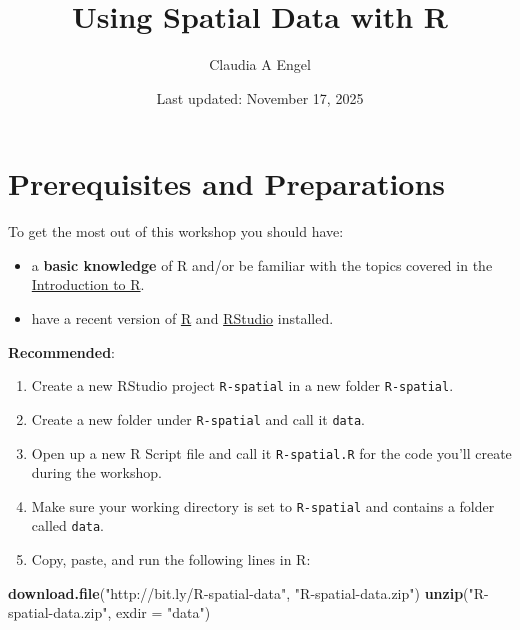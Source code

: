 \documentclass[
]{book}
\title{Using Spatial Data with R}
\author{Claudia A Engel}
\date{Last updated: November 17, 2025}
\newenvironment{Shaded}{\begin{snugshade}}{\end{snugshade}}
\newcommand{\AttributeTok}[1]{\textcolor[rgb]{0.13,0.29,0.53}{#1}}
\newcommand{\FunctionTok}[1]{\textcolor[rgb]{0.13,0.29,0.53}{\textbf{#1}}}
\newcommand{\NormalTok}[1]{#1}
\newcommand{\StringTok}[1]{\textcolor[rgb]{0.31,0.60,0.02}{#1}}
\providecommand{\tightlist}{%
  \setlength{\itemsep}{0pt}\setlength{\parskip}{0pt}}
\begin{document}
\maketitle

{
\setcounter{tocdepth}{1}
\tableofcontents
}
\chapter*{Prerequisites and Preparations}\label{prerequisites-and-preparations}

To get the most out of this workshop you should have:

\begin{itemize}
\tightlist
\item
  a \textbf{basic knowledge} of R and/or be familiar with the topics covered in the \href{https://cengel.github.io/R-intro/}{Introduction to R}.
\item
  have a recent version of \href{https://cran.r-project.org/}{R} and \href{https://www.rstudio.com/}{RStudio} installed.
\end{itemize}

\textbf{Recommended}:

\begin{enumerate}
\def\labelenumi{\arabic{enumi}.}
\tightlist
\item
  Create a new RStudio project \texttt{R-spatial} in a new folder \texttt{R-spatial}.\\
\item
  Create a new folder under \texttt{R-spatial} and call it \texttt{data}.\\
\item
  Open up a new R Script file and call it \texttt{R-spatial.R} for the code you'll create during the workshop.
\item
  Make sure your working directory is set to \texttt{R-spatial} and contains a folder called \texttt{data}.\\
\item
  Copy, paste, and run the following lines in R:
\end{enumerate}

\begin{Shaded}
\begin{Highlighting}[]
\FunctionTok{download.file}\NormalTok{(}\StringTok{"http://bit.ly/R{-}spatial{-}data"}\NormalTok{, }\StringTok{"R{-}spatial{-}data.zip"}\NormalTok{)}
\FunctionTok{unzip}\NormalTok{(}\StringTok{"R{-}spatial{-}data.zip"}\NormalTok{, }\AttributeTok{exdir =} \StringTok{"data"}\NormalTok{)}
\end{Highlighting}
\end{Shaded}
\end{document}
